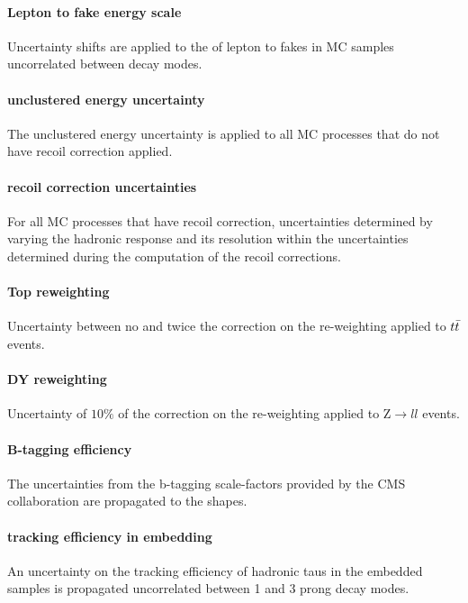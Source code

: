 \paragraph{Lepton to \tauh fake energy scale} Uncertainty shifts are applied to the \pt of lepton to \tauh fakes in MC samples uncorrelated between decay modes.

\paragraph{\MET unclustered energy uncertainty} The \MET unclustered energy uncertainty is applied to all MC processes that do not have recoil correction applied.

\paragraph{\MET recoil correction uncertainties} For all MC processes that have recoil correction, uncertainties determined by varying the hadronic response and its resolution within the uncertainties determined during the computation of the recoil corrections.

\paragraph{Top \pt reweighting} Uncertainty between no and twice the correction on the re-weighting applied to $t\Bar{t}$ events.

\paragraph{DY \pt reweighting} Uncertainty of $10\%$ of the correction on the re-weighting applied to $\mathrm{Z}\rightarrow ll$ events.

\paragraph{B-tagging efficiency} The uncertainties from the b-tagging scale-factors provided by the CMS collaboration are propagated to the shapes.

\paragraph{\tauh tracking efficiency in embedding} An uncertainty on the tracking efficiency of hadronic taus in the embedded samples is propagated uncorrelated between 1 and 3 prong decay modes.

